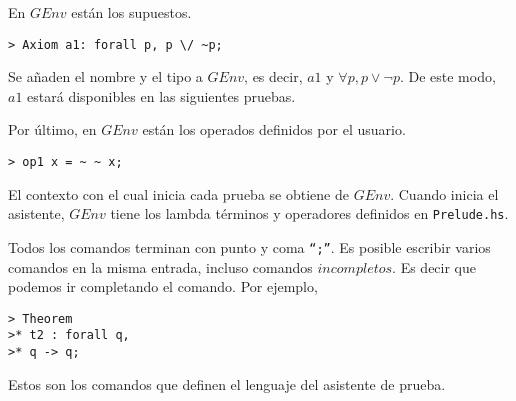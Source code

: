 \documentclass[a4paper,11pt]{article}
\theoremstyle{definition}
\theoremstyle{remark}
\begin{document}
En $GEnv$ están los supuestos.

\begin{verbatim}
> Axiom a1: forall p, p \/ ~p;
\end{verbatim}

Se añaden el nombre y el tipo a $GEnv$, es decir, $a1$ y $\forall p, p \vee \neg p$.
De este modo, $a1$ estará disponibles en las siguientes pruebas.

Por último, en $GEnv$ están los operados definidos por el usuario.

\begin{verbatim}
> op1 x = ~ ~ x;
\end{verbatim}

El contexto con el cual inicia cada prueba se obtiene de $GEnv$. Cuando inicia el asistente, $GEnv$ tiene los lambda términos
y operadores definidos en \texttt{Prelude.hs}.

Todos los comandos terminan con punto y coma \texttt{``;''}. Es posible escribir varios comandos en la misma entrada,
incluso comandos $incompletos$. Es decir que podemos ir completando el comando. 
Por ejemplo,

\begin{verbatim}
> Theorem 
>* t2 : forall q,
>* q -> q;
\end{verbatim}

Estos son los comandos que definen el lenguaje del asistente de prueba.
\end{document}
